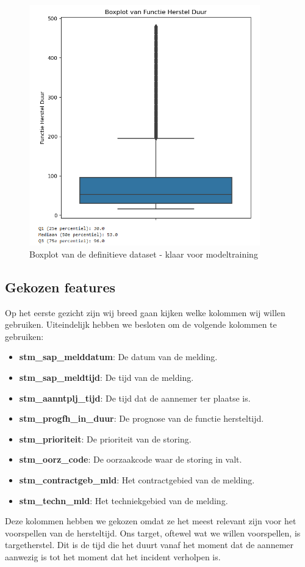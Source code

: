 \documentclass{article}
\begin{document}
\begin{figure}[H]
    \centering
    \includegraphics[width=10cm]{boxplot_target_filter.png}
    \caption{Boxplot van de definitieve dataset - klaar voor modeltraining}
\end{figure}

\subsection{Gekozen features}
Op het eerste gezicht zijn wij breed gaan kijken welke kolommen wij willen gebruiken. Uiteindelijk hebben we besloten om de volgende kolommen te gebruiken:
\begin{itemize}
  \item \textbf{stm\_sap\_melddatum}: De datum van de melding.
  \item \textbf{stm\_sap\_meldtijd}: De tijd van de melding.
  \item \textbf{stm\_aanntplj\_tijd}: De tijd dat de aannemer ter plaatse is. 
  \item \textbf{stm\_progfh\_in\_duur}: De prognose van de functie hersteltijd.
  \item \textbf{stm\_prioriteit}: De prioriteit van de storing.
  \item \textbf{stm\_oorz\_code}: De oorzaakcode waar de storing in valt.
  \item \textbf{stm\_contractgeb\_mld}: Het contractgebied van de melding.
  \item \textbf{stm\_techn\_mld}: Het techniekgebied van de melding.
\end{itemize}
Deze kolommen hebben we gekozen omdat ze het meest relevant zijn voor het voorspellen van de hersteltijd. Ons target, oftewel wat we willen voorspellen, is targetherstel. Dit is de tijd die het duurt vanaf het moment dat de aannemer aanwezig is tot het moment dat het incident verholpen is.
\end{document}
